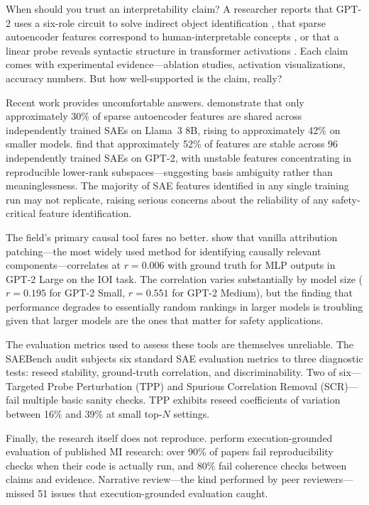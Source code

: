 \documentclass[10pt]{article}
\begin{document}
When should you trust an interpretability claim? A researcher reports that GPT-2 uses a six-role circuit to solve indirect object identification \citep{wang2023interpretability}, that sparse autoencoder features correspond to human-interpretable concepts \citep{cunningham2023sparse}, or that a linear probe reveals syntactic structure in transformer activations \citep{belinkov2022probing}. Each claim comes with experimental evidence---ablation studies, activation visualizations, accuracy numbers. But how well-supported is the claim, really?

Recent work provides uncomfortable answers. \citet{paulo2025sparse} demonstrate that only approximately 30\% of sparse autoencoder features are shared across independently trained SAEs on Llama~3 8B, rising to approximately 42\% on smaller models. \citet{gerasimov2026unstable} find that approximately 52\% of features are stable across 96 independently trained SAEs on GPT-2, with unstable features concentrating in reproducible lower-rank subspaces---suggesting basis ambiguity rather than meaninglessness. The majority of SAE features identified in any single training run may not replicate, raising serious concerns about the reliability of any safety-critical feature identification.

The field's primary causal tool fares no better. \citet{rezaeijafari2025relp} show that vanilla attribution patching---the most widely used method for identifying causally relevant components---correlates at $r = 0.006$ with ground truth for MLP outputs in GPT-2 Large on the IOI task. The correlation varies substantially by model size ($r = 0.195$ for GPT-2 Small, $r = 0.551$ for GPT-2 Medium), but the finding that performance degrades to essentially random rankings in larger models is troubling given that larger models are the ones that matter for safety applications.

The evaluation metrics used to assess these tools are themselves unreliable. The SAEBench audit \citep{chanin2026saebench} subjects six standard SAE evaluation metrics to three diagnostic tests: reseed stability, ground-truth correlation, and discriminability. Two of six---Targeted Probe Perturbation (TPP) and Spurious Correlation Removal (SCR)---fail multiple basic sanity checks. TPP exhibits reseed coefficients of variation between 16\% and 39\% at small top-$N$ settings.

Finally, the research itself does not reproduce. \citet{bai2026mecheval} perform execution-grounded evaluation of published MI research: over 90\% of papers fail reproducibility checks when their code is actually run, and 80\% fail coherence checks between claims and evidence. Narrative review---the kind performed by peer reviewers---missed 51 issues that execution-grounded evaluation caught.
\end{document}
